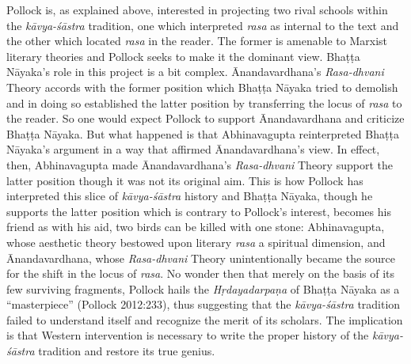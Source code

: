 Pollock is, as explained above, interested in projecting two rival schools within the \textsl{kāvya-śāstra} tradition, one which interpreted \textsl{rasa} as internal to the text and the other which located \textsl{rasa} in the reader. The former is amenable to Marxist literary theories and Pollock seeks to make it the dominant view. Bhaṭṭa Nāyaka's role in this project is a bit complex. Ānandavardhana's \textsl{Rasa-dhvani} Theory accords with the former position which Bhaṭṭa Nāyaka tried to demolish and in doing so established the latter position by transferring the locus of \textsl{rasa} to the reader. So one would expect Pollock to support Ānandavardhana and criticize Bhaṭṭa Nāyaka. But what happened is that Abhinavagupta reinterpreted Bhaṭṭa Nāyaka's argument in a way that affirmed Ānandavardhana's view. In effect, then, Abhinavagupta made Ānandavardhana's \textsl{Rasa-dhvani} Theory support the latter position though it was not its original aim. This is how Pollock has interpreted this slice of \textsl{kāvya-śāstra} history and Bhaṭṭa Nāyaka, though he supports the latter position which is contrary to Pollock's interest, becomes his friend as with his aid, two birds can be killed with one stone: Abhinavagupta, whose aesthetic theory bestowed upon literary \textsl{rasa} a spiritual dimension, and Ānandavardhana, whose \textsl{Rasa-dhvani} Theory unintentionally became the source for the shift in the locus of \textsl{rasa}. No wonder then that merely on the basis of its few surviving fragments, Pollock hails the \textsl{Hṛdayadarpaṇa} of Bhaṭṭa Nāyaka as a ``masterpiece'' (Pollock 2012:233), thus suggesting that the \textsl{kāvya-śāstra} tradition failed to understand itself and recognize the merit of its scholars. The implication is that Western intervention is necessary to write the proper history of the \textsl{kāvya-śāstra} tradition and restore its true genius.

